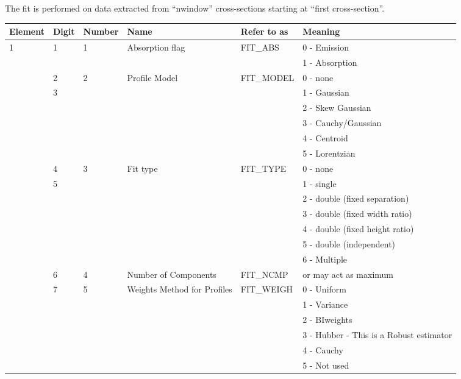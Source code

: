 The fit is performed on data extracted from ``nwindow'' cross-sections 
starting at ``first cross-section''.

\begin{table}[ht]
\small
\begin{center}
\tiny
\begin{tabular}{|l|l|l|l|l|l|} \hline
Element & Digit & Number & Name & Refer to as &Meaning\\ \hline
1 & 1 & 1 & Absorption flag & FIT\_ABS & 0 - Emission\\
  &   &   &                 & & 1 - Absorption\\ \cline{2-6}
  & 2 & 2 & Profile Model & FIT\_MODEL & 0 - none\\            
  & 3 &   &               &            & 1 - Gaussian\\        
  &   &   &               &            & 2 - Skew Gaussian\\   
  &   &   &               &            & 3 - Cauchy/Gaussian\\ 
  &   &   &               &            & 4 - Centroid\\
  &   &   &               &            & 5 - Lorentzian\\ \cline{2-6}
  & 4 & 3 & Fit type      & FIT\_TYPE & 0 - none \\
  & 5 &   &               &           & 1 - single \\
  &   &   &               &           & 2 - double (fixed separation) \\
  &   &   &               &          & 3 - double (fixed width ratio) \\
  &   &   &               &         & 4 - double (fixed height ratio) \\
  &   &   &               &           & 5 - double (independent) \\
  &   &   &               &           & 6 - Multiple \\ \cline{2-6}
  & 6 & 4 & Number of Components & FIT\_NCMP & or may act as maximum\\
\cline{2-6}
  & 7 & 5 & Weights Method for Profiles & FIT\_WEIGH & 0 - Uniform\\
  &   &   & & & 1 - Variance\\
  &   &   & & & 2 - BIweights\\
  &   &   & & & 3 - Hubber - This is a Robust estimator\\
  &   &   & & & 4 - Cauchy\\
  &   &   & & & 5 - Not used \\

\end{tabular}
\end{center}
\end{table}
